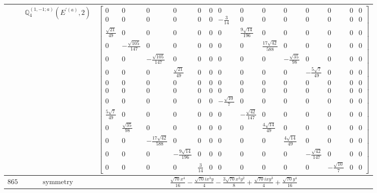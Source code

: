 \documentclass[fleqn,8pt,landscape]{jsarticle}
\begin{document}
\begin{longtable}{ccc}
$  $ & $ \mathbb{Q}_{4}^{(1,-1;a)}(E^{\prime(a)},2) $ & $ \begin{bmatrix} 0 & 0 & 0 & 0 & 0 & 0 & 0 & 0 & 0 & 0 & 0 & 0 & 0 & 0 \\ 0 & 0 & 0 & 0 & 0 & 0 & - \frac{3}{14} & 0 & 0 & 0 & 0 & 0 & 0 & 0 \\ \frac{\sqrt{21}}{49} & 0 & 0 & 0 & 0 & 0 & 0 & \frac{9 \sqrt{14}}{196} & 0 & 0 & 0 & 0 & 0 & 0 \\ 0 & - \frac{\sqrt{105}}{147} & 0 & 0 & 0 & 0 & 0 & 0 & \frac{17 \sqrt{42}}{588} & 0 & 0 & 0 & 0 & 0 \\ 0 & 0 & - \frac{\sqrt{105}}{147} & 0 & 0 & 0 & 0 & 0 & 0 & - \frac{\sqrt{35}}{98} & 0 & 0 & 0 & 0 \\ 0 & 0 & 0 & \frac{\sqrt{21}}{49} & 0 & 0 & 0 & 0 & 0 & 0 & - \frac{5 \sqrt{7}}{49} & 0 & 0 & 0 \\ 0 & 0 & 0 & 0 & 0 & 0 & 0 & 0 & 0 & 0 & 0 & 0 & 0 & 0 \\ 0 & 0 & 0 & 0 & 0 & 0 & 0 & 0 & 0 & 0 & 0 & 0 & 0 & 0 \\ 0 & 0 & 0 & 0 & 0 & 0 & - \frac{\sqrt{10}}{7} & 0 & 0 & 0 & 0 & 0 & 0 & 0 \\ \frac{5 \sqrt{7}}{49} & 0 & 0 & 0 & 0 & 0 & 0 & - \frac{\sqrt{42}}{147} & 0 & 0 & 0 & 0 & 0 & 0 \\ 0 & \frac{\sqrt{35}}{98} & 0 & 0 & 0 & 0 & 0 & 0 & \frac{4 \sqrt{14}}{49} & 0 & 0 & 0 & 0 & 0 \\ 0 & 0 & - \frac{17 \sqrt{42}}{588} & 0 & 0 & 0 & 0 & 0 & 0 & \frac{4 \sqrt{14}}{49} & 0 & 0 & 0 & 0 \\ 0 & 0 & 0 & - \frac{9 \sqrt{14}}{196} & 0 & 0 & 0 & 0 & 0 & 0 & - \frac{\sqrt{42}}{147} & 0 & 0 & 0 \\ 0 & 0 & 0 & 0 & \frac{3}{14} & 0 & 0 & 0 & 0 & 0 & 0 & - \frac{\sqrt{10}}{7} & 0 & 0 \end{bmatrix} $ \\ \hline
$ 865 $ & $ \text{symmetry} $ & $ \frac{\sqrt{70} x^{4}}{16} - \frac{\sqrt{70} i x^{3} y}{4} - \frac{3 \sqrt{70} x^{2} y^{2}}{8} + \frac{\sqrt{70} i x y^{3}}{4} + \frac{\sqrt{70} y^{4}}{16} $ \\

\end{longtable}
\end{document}
